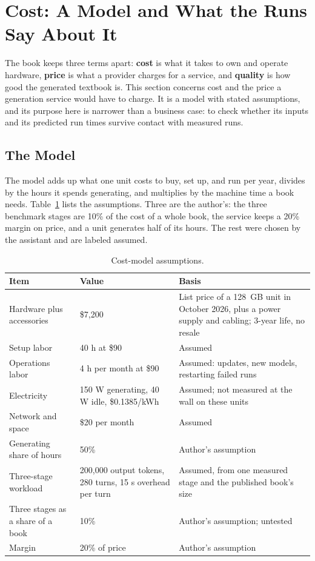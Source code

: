 \section{Cost: A Model and What the Runs Say About It}
\label{sec:cost}

The book keeps three terms apart: \textbf{cost} is what it takes to own and operate hardware, \textbf{price} is what a provider charges for a service, and \textbf{quality} is how good the generated textbook is. This section concerns cost and the price a generation service would have to charge. It is a model with stated assumptions, and its purpose here is narrower than a business case: to check whether its inputs and its predicted run times survive contact with measured runs.

\subsection{The Model}

The model adds up what one unit costs to buy, set up, and run per year, divides by the hours it spends generating, and multiplies by the machine time a book needs. Table~\ref{tab:costassume} lists the assumptions. Three are the author's: the three benchmark stages are 10\% of the cost of a whole book, the service keeps a 20\% margin on price, and a unit generates half of its hours. The rest were chosen by the assistant and are labeled assumed.

\begin{table}[htbp]
\centering
\small
\begin{tabular}{@{}p{4.3cm}p{4.3cm}p{6.6cm}@{}}
\toprule
\textbf{Item} & \textbf{Value} & \textbf{Basis} \\
\midrule
Hardware plus accessories & \$7,200 & List price of a 128~GB unit in October 2026, plus a power supply and cabling; 3-year life, no resale \\
Setup labor & 40 h at \$90 & Assumed \\
Operations labor & 4 h per month at \$90 & Assumed: updates, new models, restarting failed runs \\
Electricity & 150 W generating, 40 W idle, \$0.1385/kWh & Assumed; not measured at the wall on these units \\
Network and space & \$20 per month & Assumed \\
Generating share of hours & 50\% & Author's assumption \\
Three-stage workload & 200,000 output tokens, 280 turns, 15 s overhead per turn & Assumed, from one measured stage and the published book's size \\
Three stages as a share of a book & 10\% & Author's assumption; untested \\
Margin & 20\% of price & Author's assumption \\
\bottomrule
\end{tabular}
\caption{Cost-model assumptions.}
\label{tab:costassume}
\end{table}


